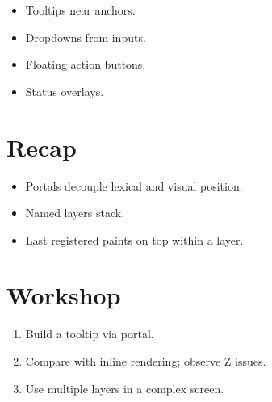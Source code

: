 \begin{itemize}[leftmargin=*]
  \item Tooltips near anchors.
  \item Dropdowns from inputs.
  \item Floating action buttons.
  \item Status overlays.
\end{itemize}

\section{Recap}

\begin{recap}
\begin{itemize}[leftmargin=*]
  \item Portals decouple lexical and visual position.
  \item Named layers stack.
  \item Last registered paints on top within a layer.
\end{itemize}
\end{recap}

\section*{Workshop}

\begin{enumerate}[leftmargin=*]
  \item Build a tooltip via portal.
  \item Compare with inline rendering; observe Z issues.
  \item Use multiple layers in a complex screen.
\end{enumerate}
